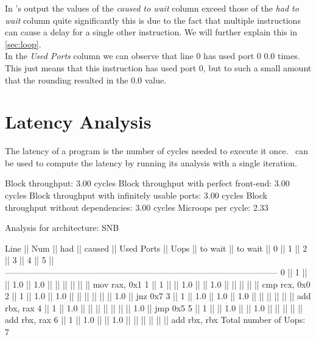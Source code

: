 In \suaca's output the values of the \emph{caused to wait} column exceed those of the \emph{had to wait} column quite significantly this is due to the fact that multiple instructions can cause a delay for a single other instruction. We will further explain this in \autoref{sec:loop}.\\
In the \emph{Used Ports} column we can observe that line $0$ has used port $0$ $0.0$ times. This just means that this instruction has used port $0$, but to such a small amount that the rounding resulted in the $0.0$ value.




\section{Latency Analysis}
\label{sec:loop}

The latency of a program is the number of cycles needed to execute it once. \suaca\ can be used to compute the latency by running its analysis with a single iteration. 

\begin{example}
    Block throughput: 3.00 cycles
    Block throughput with perfect front-end: 3.00 cycles
    Block throughput with infinitely usable ports: 3.00 cycles
    Block throughput without dependencies: 3.00 cycles
    Microops per cycle: 2.33
    
    Analysis for architecture: SNB
    
     Line  ||   Num   ||   had   || caused  ||            Used Ports
           ||   Uops  || to wait || to wait ||   0   ||   1   ||   2   ||   3   ||   4   ||   5   ||
    ------------------------------------------------------------------------------------------------
       0   ||    1    ||         ||   1.0   ||  1.0  ||       ||       ||       ||       ||       || mov rax, 0x1
       1   ||    1    ||         ||   1.0   ||       ||  1.0  ||       ||       ||       ||       || cmp rcx, 0x0
       2   ||    1    ||   1.0   ||   1.0   ||       ||       ||       ||       ||       ||  1.0  || jnz 0x7
       3   ||    1    ||   1.0   ||   1.0   ||  1.0  ||       ||       ||       ||       ||       || add rbx, rax
       4   ||    1    ||   1.0   ||         ||       ||       ||       ||       ||       ||  1.0  || jmp 0x5
       5   ||    1    ||         ||   1.0   ||       ||  1.0  ||       ||       ||       ||       || add rbx, rax
       6   ||    1    ||   1.0   ||         ||  1.0  ||       ||       ||       ||       ||       || add rbx, rbx
    Total number of Uops: 7
\end{example}

